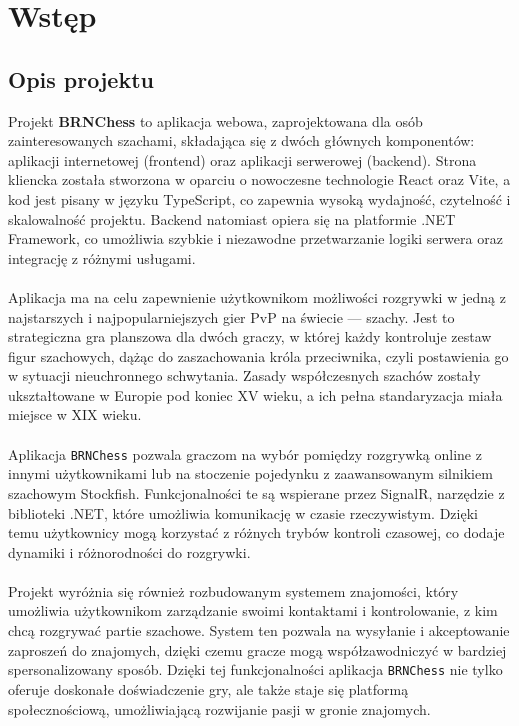 \documentclass[12pt,a4paper]{article}
\begin{document}
\newpage

\tableofcontents

\newpage

\section{Wstęp}

\subsection{Opis projektu}

Projekt \textbf{BRNChess} to aplikacja webowa, zaprojektowana dla osób zainteresowanych szachami, składająca się z dwóch głównych komponentów: aplikacji internetowej (frontend) oraz aplikacji serwerowej (backend). Strona kliencka została stworzona w oparciu o nowoczesne technologie React oraz Vite, a kod jest pisany w języku TypeScript, co zapewnia wysoką wydajność, czytelność i skalowalność projektu. Backend natomiast opiera się na platformie .NET Framework, co umożliwia szybkie i niezawodne przetwarzanie logiki serwera oraz integrację z różnymi usługami.
\\\\
Aplikacja ma na celu zapewnienie użytkownikom możliwości rozgrywki w jedną z najstarszych i najpopularniejszych gier PvP na świecie — szachy. Jest to strategiczna gra planszowa dla dwóch graczy, w której każdy kontroluje zestaw figur szachowych, dążąc do zaszachowania króla przeciwnika, czyli postawienia go w sytuacji nieuchronnego schwytania. Zasady współczesnych szachów zostały ukształtowane w Europie pod koniec XV wieku, a ich pełna standaryzacja miała miejsce w XIX wieku.
\\\\
Aplikacja \texttt{BRNChess} pozwala graczom na wybór pomiędzy rozgrywką online z innymi użytkownikami lub na stoczenie pojedynku z zaawansowanym silnikiem szachowym Stockfish. Funkcjonalności te są wspierane przez SignalR, narzędzie z biblioteki .NET, które umożliwia komunikację w czasie rzeczywistym. Dzięki temu użytkownicy mogą korzystać z różnych trybów kontroli czasowej, co dodaje dynamiki i różnorodności do rozgrywki.
\\\\
Projekt wyróżnia się również rozbudowanym systemem znajomości, który umożliwia użytkownikom zarządzanie swoimi kontaktami i kontrolowanie, z kim chcą rozgrywać partie szachowe. System ten pozwala na wysyłanie i akceptowanie zaproszeń do znajomych, dzięki czemu gracze mogą współzawodniczyć w bardziej spersonalizowany sposób. Dzięki tej funkcjonalności aplikacja \texttt{BRNChess} nie tylko oferuje doskonałe doświadczenie gry, ale także staje się platformą społecznościową, umożliwiającą rozwijanie pasji w gronie znajomych.
\end{document}
